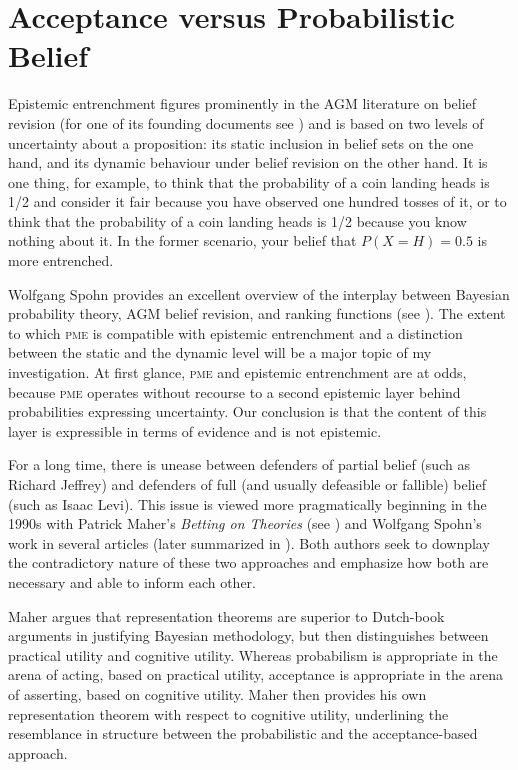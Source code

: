 \documentclass[phd,12pt,oneside]{ubcthesis}
\begin{document}
\section{Acceptance versus Probabilistic Belief}
\label{sec:iephahce}

Epistemic entrenchment figures prominently in the AGM literature on
belief revision (for one of its founding documents see
) and is based on two levels of uncertainty about a
proposition: its static inclusion in belief sets on the one hand, and
its dynamic behaviour under belief revision on the other hand. It is
one thing, for example, to think that the probability of a coin
landing heads is 1/2 and consider it fair because you have observed
one hundred tosses of it, or to think that the probability of a coin
landing heads is 1/2 because you know nothing about it. In the former
scenario, your belief that $P(X=H)=0.5$ is more entrenched.

Wolfgang Spohn provides an excellent overview of the interplay between
Bayesian probability theory, AGM belief revision, and ranking
functions (see ). The extent to which \textsc{pme}
is compatible with epistemic entrenchment and a distinction between
the static and the dynamic level will be a major topic of my
investigation. At first glance, \textsc{pme} and epistemic
entrenchment are at odds, because \textsc{pme} operates without
recourse to a second epistemic layer behind probabilities expressing
uncertainty. Our conclusion is that the content of this layer is
expressible in terms of evidence and is not epistemic.

For a long time, there is unease between defenders of partial belief
(such as Richard Jeffrey) and defenders of full (and usually
defeasible or fallible) belief (such as Isaac Levi). This issue is
viewed more pragmatically beginning in the 1990s with Patrick Maher's
\emph{Betting on Theories} (see ) and Wolfgang
Spohn's work in several articles (later summarized in
). Both authors seek to downplay the contradictory
nature of these two approaches and emphasize how both are necessary
and able to inform each other.

Maher argues that representation theorems are superior to Dutch-book
arguments in justifying Bayesian methodology, but then distinguishes
between practical utility and cognitive utility. Whereas probabilism
is appropriate in the arena of acting, based on practical utility,
acceptance is appropriate in the arena of asserting, based on
cognitive utility. Maher then provides his own representation theorem
with respect to cognitive utility, underlining the resemblance in
structure between the probabilistic and the acceptance-based approach.
\end{document}

